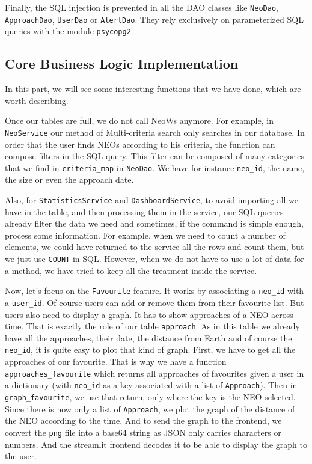 Finally, the SQL injection is prevented in all the DAO classes like \texttt{NeoDao}, \texttt{ApproachDao}, \texttt{UserDao} or \texttt{AlertDao}. They rely exclusively on parameterized SQL queries with the module \texttt{psycopg2}.

\subsection{Core Business Logic Implementation}

\bigskip
\bigskip

In this part, we will see some interesting functions that we have done, which are worth describing.

\bigskip

Once our tables are full, we do not call NeoWs anymore. For example, in \texttt{NeoService} our method of Multi-criteria search only searches in our database. In order that the user finds NEOs according to his criteria, the function can compose filters in the SQL query. This filter can be composed of many categories that we find in \texttt{criteria\_map} in \texttt{NeoDao}. We have for instance \texttt{neo\_id}, the name, the size or even the approach date.

\bigskip

Also, for \texttt{StatisticsService} and \texttt{DashboardService}, to avoid importing all we have in the table, and then processing them in the service, our SQL queries already filter the data we need and sometimes, if the command is simple enough, process some information. For example, when we need to count a number of elements, we could have returned to the service all the rows and count them, but we just use \texttt{COUNT} in SQL. However, when we do not have to use a lot of data for a method, we have tried to keep all the treatment inside the service.

\bigskip
\bigskip

Now, let's focus on the \texttt{Favourite} feature. It works by associating a \texttt{neo\_id} with a \texttt{user\_id}. Of course users can add or remove them from their favourite list. But users also need to display a graph. It has to show approaches of a NEO across time. That is exactly the role of our table \texttt{approach}. As in this table we already have all the approaches, their date, the distance from Earth and of course the \texttt{neo\_id}, it is quite easy to plot that kind of graph. First, we have to get all the approaches of our favourite. That is why we have a function \texttt{approaches\_favourite} which returns all approaches of favourites given a user in a dictionary (with \texttt{neo\_id} as a key associated with a list of \texttt{Approach}). Then in \texttt{graph\_favourite}, we use that return, only where the key is the NEO selected. Since there is now only a list of \texttt{Approach}, we plot the graph of the distance of the NEO according to the time. And to send the graph to the frontend, we convert the \texttt{png} file into a base64 string as JSON only carries characters or numbers. And the streamlit frontend decodes it to be able to display the graph to the user.


